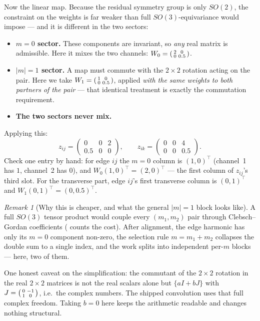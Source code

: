 \documentclass[11pt,a4paper]{report}
\theoremstyle{definition}
\theoremstyle{remark}
\newtheorem{remark}[remark]{Remark}
\begin{document}
Now the linear map. Because the residual symmetry group is only $SO(2)$,
the constraint on the weights is far weaker than full $SO(3)$-equivariance
would impose --- and it is different in the two sectors:

\begin{itemize}
\item \textbf{$m=0$ sector.} These components are invariant, so \emph{any}
      real matrix is admissible. Here it mixes the two channels:
      $W_0=\begin{psmallmatrix}2&0\\ 0&0.5\end{psmallmatrix}$.
\item \textbf{$|m|=1$ sector.} A map must commute with the $2\times2$
      rotation acting on the pair. Here we take
      $W_1=\begin{psmallmatrix}1&0\\ 0&0.5\end{psmallmatrix}$, applied
      \emph{with the same weights to both partners of the pair} --- that
      identical treatment is exactly the commutation requirement.
\item \textbf{The two sectors never mix.}
\end{itemize}

Applying this:
\[
z_{ij}=\begin{pmatrix}0&0&2\\ 0.5&0&0\end{pmatrix},
\qquad
z_{ik}=\begin{pmatrix}0&0&4\\ 0&0&0.5\end{pmatrix} .
\]
Check one entry by hand: for edge $ij$ the $m=0$ column is $(1,0)^\top$
(channel~1 has $1$, channel~2 has $0$), and $W_0(1,0)^\top=(2,0)^\top$ ---
the first column of $z_{ij}$'s third slot. For the transverse part, edge
$ij$'s first transverse column is $(0,1)^\top$ and
$W_1(0,1)^\top=(0,0.5)^\top$.

\begin{remark}[Why this is cheaper, and what the general $|m|=1$ block looks like]
\label{rem:so2-commutant}
A full $SO(3)$ tensor product would couple every $(m_1,m_2)$ pair through
Clebsch--Gordan coefficients ( counts the cost). After
alignment, the edge harmonic has only its $m=0$ component non-zero, the
selection rule $m=m_1+m_2$ collapses the double sum to a single index, and
the work splits into independent per-$m$ blocks --- here, two of them.

One honest caveat on the simplification: the commutant of the $2\times2$
rotation in the real $2\times2$ matrices is not the real scalars alone but
$\{aI+bJ\}$ with $J=\begin{psmallmatrix}0&-1\\1&0\end{psmallmatrix}$, i.e.\
the complex numbers. The shipped convolution uses that full complex
freedom. Taking $b=0$ here keeps the arithmetic readable and changes
nothing structural.
\end{remark}
\end{document}
